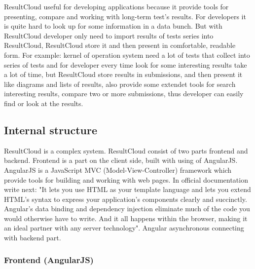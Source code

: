 ResultCloud useful for developing applications because it provide tools for presenting, compare and working with long-term test's results. For developers it is quite hard to look up for some information in a data bunch. But with ResultCloud developer only need to import results of tests series into ResultCloud, ResultCloud store it and then present in comfortable, readable form. For example: kernel of operation system need a lot of tests that collect into series of tests and for developer every time look for some interesting results take a lot of time, but ResultCloud store results in submissions, and then present it like diagrams and lists of results, also provide some extendet tools for search interesting results, compare two or more submissions, thus developer can easily find or look at the results.

\subsection{Internal structure}

ResultCloud is a complex system. ResultCloud consist of two parts frontend and backend. Frontend is a part on the client side, built with using of AngularJS. AngularJS is a JavaScript MVC (Model-View-Controller) framework which provide tools for building and working with web pages. In official documentation write next: "It lets you use HTML as your template language and lets you extend HTML's syntax to express your application's components clearly and succinctly. Angular's data binding and dependency injection eliminate much of the code you would otherwise have to write. And it all happens within the browser, making it an ideal partner with any server technology"\cite{angularJS}. Angular asynchronous connecting with backend part. 

\subsubsection{Frontend (AngularJS)}

